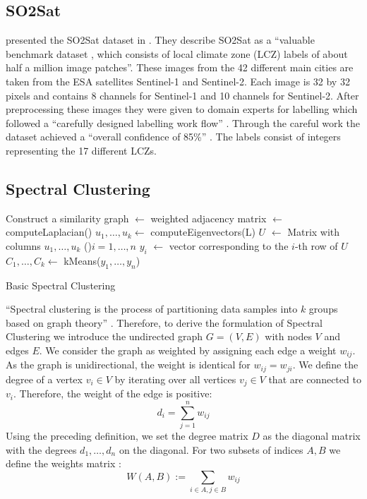 \subsection{SO2Sat}
\label{subsec:so2sat}
\citeauthor{zhu_so2sat_2019} presented the SO2Sat dataset in \cite{zhu_so2sat_2019}.
They describe SO2Sat as a \enquote{valuable benchmark dataset \textelp{}, which consists of local climate zone (LCZ) labels of about half a million \textelp{} image patches}.
These images from the 42 different main cities are taken from the \gls{ESA} satellites Sentinel-1 and Sentinel-2. Each image is 32 by 32 pixels and contains 8 channels for Sentinel-1 and 10 channels for Sentinel-2.
After preprocessing these images they were given to domain experts for labelling which followed a \enquote{carefully designed labelling work flow} \cite{zhu_so2sat_2019}.
Through the careful work the dataset achieved a \enquote{overall confidence of 85\%} \cite{zhu_so2sat_2019}.
The labels consist of integers representing the 17 different \glspl{LCZ}.

\subsection{Spectral Clustering}
\label{subsec:spectral_clustering}

\begin{algorithm}[b]
  Construct a similarity graph\;
  \Adj \(\leftarrow\) weighted adjacency matrix\;
  \Laplace \(\leftarrow\) computeLaplacian(\Adj)\;
  \(u_1, \ldots, u_k \leftarrow\) computeEigenvectors(L)\;
  \(U\) \(\leftarrow\) Matrix with columns \(u_1, \ldots, u_k\)\;
  \ForEach(){\(i = 1, \ldots, n\)}{
    \(y_i\) \(\leftarrow\) vector corresponding to the \(i\)-th row of \(U\)
  }
\(C_1, \ldots, C_k \leftarrow\) kMeans(\(y_1, \ldots, y_n\))\;

  \caption{Basic Spectral Clustering}\label{alg:basic_spectral}
 \end{algorithm}

\enquote{Spectral clustering is the process of partitioning data samples into
\(k\) groups based on graph theory} \cite{krajsek_helmholtz_nodate}. Therefore,
to derive the formulation of Spectral Clustering we introduce the undirected graph \(G=(V, E)\) with nodes \(V\) and edges \(E\).
We consider the graph as weighted by assigning each edge a weight \(w_{ij}\). As the graph
is unidirectional, the weight is identical for \(w_{ij} = w_{ji} \).
We define the degree of a vertex \(v_i \in V\) by iterating over all vertices \(v_j \in V\) that are connected to \(v_i\).
Therefore, the weight of the edge is positive:
\[d_i = \sum_{j=1}^n w_{ij}\]
Using the preceding definition, we set the degree matrix \(D\) as the diagonal matrix with the degrees \(d_1, \ldots, d_n\) on the diagonal.
\cite{von_luxburg_tutorial_2007}
For two subsets of indices \(A, B\) we define the weights matrix \cite{von_luxburg_tutorial_2007}:
\[W(A, B) := \sum_{i \in A, j \in B} w_{ij}\]


